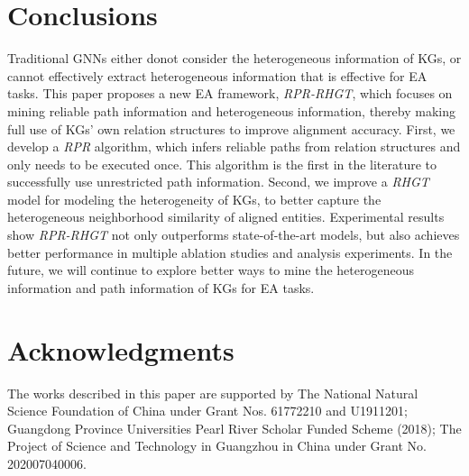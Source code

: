\documentclass{article}
\begin{document}
\begin{table}[]
	\centering
	\caption{Comparison of training time and alignment time.}
	\label{tb4}
\end{table}
%

\section{Conclusions}
\label{sec5}

Traditional GNNs either donot consider the heterogeneous information of KGs, or cannot effectively extract heterogeneous information that is effective for EA tasks.
This paper proposes a new EA framework, \textit{RPR-RHGT}, which focuses on mining reliable path information and heterogeneous information, thereby making full use of KGs' own relation structures to improve alignment accuracy.
%
First, we develop a \textit{RPR} algorithm, which infers reliable paths from relation structures and only needs to be executed once. 
This algorithm is the first in the literature to successfully use unrestricted path information. 
Second, we improve a \textit{RHGT} model for modeling the heterogeneity of KGs, to better capture the heterogeneous neighborhood similarity of aligned entities.
%
Experimental results show \textit{RPR-RHGT} not only outperforms state-of-the-art models, but also achieves better performance in multiple ablation studies and analysis experiments.
In the future, we will continue to explore better ways to mine the heterogeneous information and path information of KGs for EA tasks.



\section*{Acknowledgments}
The works described in this paper are supported by The National Natural Science Foundation of China under Grant Nos. 61772210 and U1911201;
Guangdong Province Universities Pearl River Scholar Funded Scheme (2018);
The Project of Science and Technology in Guangzhou in China under Grant No. 202007040006.


\end{document}
